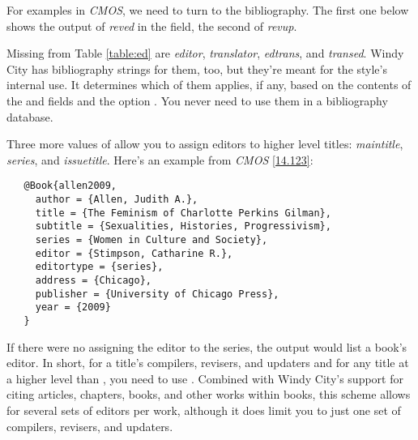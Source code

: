 \documentclass[11pt,letterpaper,oneside]{article}
\begin{document}
For examples in \textit{CMOS}, we need to turn to the bibliography.
The first one below shows the output of \textit{reved} in the
 field, the second of \textit{revup}.

\begin{citebib}
\item \cite{fowler1965}
\item \cite{gowers2015}
\end{citebib}


Missing from Table \ref{table:ed} are \textit{editor},
\textit{translator}, \textit{edtrans}, and \textit{transed}. Windy
City has bibliography strings for them, too, but they're meant for the
style's internal use. It determines which of them applies, if any,
based on the contents of the  and
 fields and the option . You never
need to use them in a bibliography database.

Three more values of  allow you to assign editors
to higher level titles: \textit{maintitle}, \textit{series}, and
\textit{issuetitle}. Here's an example from \textit{CMOS}
\ref{14.123}:

\begin{verbatim}
   @Book{allen2009,
     author = {Allen, Judith A.},
     title = {The Feminism of Charlotte Perkins Gilman},
     subtitle = {Sexualities, Histories, Progressivism},
     series = {Women in Culture and Society},
     editor = {Stimpson, Catharine R.},
     editortype = {series},
     address = {Chicago},
     publisher = {University of Chicago Press},
     year = {2009}
   }
\end{verbatim}

\begin{citebib}
\item \cite{allen2009}
\end{citebib}

\noindent If there were no  assigning the editor
to the series, the output would list a book's editor. In short, for a
title's compilers, revisers, and updaters and for any title at a
higher level than , you need to use
. Combined with Windy City's support for citing
articles, chapters, books, and other works within books, this scheme
allows for several sets of editors per work, although it does limit
you to just one set of compilers, revisers, and updaters.
\end{document}
